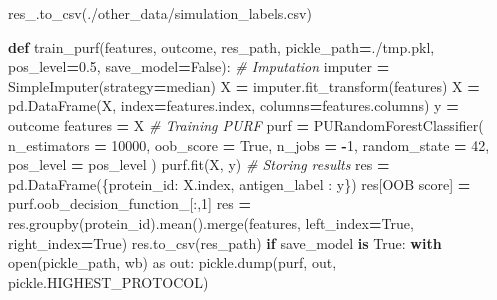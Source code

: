 \documentclass[
  11pt,
  oneside]{book}
\newenvironment{Shaded}{\begin{snugshade}}{\end{snugshade}}
\newcommand{\BuiltInTok}[1]{#1}
\newcommand{\CommentTok}[1]{\textcolor[rgb]{0.56,0.35,0.01}{\textit{#1}}}
\newcommand{\ControlFlowTok}[1]{\textcolor[rgb]{0.13,0.29,0.53}{\textbf{#1}}}
\newcommand{\DecValTok}[1]{\textcolor[rgb]{0.00,0.00,0.81}{#1}}
\newcommand{\FloatTok}[1]{\textcolor[rgb]{0.00,0.00,0.81}{#1}}
\newcommand{\ImportTok}[1]{#1}
\newcommand{\KeywordTok}[1]{\textcolor[rgb]{0.13,0.29,0.53}{\textbf{#1}}}
\newcommand{\NormalTok}[1]{#1}
\newcommand{\OperatorTok}[1]{\textcolor[rgb]{0.81,0.36,0.00}{\textbf{#1}}}
\newcommand{\StringTok}[1]{\textcolor[rgb]{0.31,0.60,0.02}{#1}}
\newcommand{\VariableTok}[1]{\textcolor[rgb]{0.00,0.00,0.00}{#1}}
\begin{document}
\begin{Shaded}
\begin{Highlighting}[]
\NormalTok{res\_.to\_csv(}\StringTok{\textquotesingle{}./other\_data/simulation\_labels.csv\textquotesingle{}}\NormalTok{)}
\end{Highlighting}
\end{Shaded}

\begin{Shaded}
\begin{Highlighting}[]
\KeywordTok{def}\NormalTok{ train\_purf(features, outcome, res\_path, pickle\_path}\OperatorTok{=}\StringTok{\textquotesingle{}./tmp.pkl\textquotesingle{}}\NormalTok{, pos\_level}\OperatorTok{=}\FloatTok{0.5}\NormalTok{, save\_model}\OperatorTok{=}\VariableTok{False}\NormalTok{):}
    \CommentTok{\# Imputation}
\NormalTok{    imputer }\OperatorTok{=}\NormalTok{ SimpleImputer(strategy}\OperatorTok{=}\StringTok{\textquotesingle{}median\textquotesingle{}}\NormalTok{)}
\NormalTok{    X }\OperatorTok{=}\NormalTok{ imputer.fit\_transform(features)}
\NormalTok{    X }\OperatorTok{=}\NormalTok{ pd.DataFrame(X, index}\OperatorTok{=}\NormalTok{features.index, columns}\OperatorTok{=}\NormalTok{features.columns)}
\NormalTok{    y }\OperatorTok{=}\NormalTok{ outcome}
\NormalTok{    features }\OperatorTok{=}\NormalTok{ X}
    \CommentTok{\# Training PURF}
\NormalTok{    purf }\OperatorTok{=}\NormalTok{ PURandomForestClassifier(}
\NormalTok{        n\_estimators }\OperatorTok{=} \DecValTok{10000}\NormalTok{,}
\NormalTok{        oob\_score }\OperatorTok{=} \VariableTok{True}\NormalTok{,}
\NormalTok{        n\_jobs }\OperatorTok{=} \OperatorTok{{-}}\DecValTok{1}\NormalTok{,}
\NormalTok{        random\_state }\OperatorTok{=} \DecValTok{42}\NormalTok{,}
\NormalTok{        pos\_level }\OperatorTok{=}\NormalTok{ pos\_level}
\NormalTok{    )}
\NormalTok{    purf.fit(X, y)}
    \CommentTok{\# Storing results}
\NormalTok{    res }\OperatorTok{=}\NormalTok{ pd.DataFrame(\{}\StringTok{\textquotesingle{}protein\_id\textquotesingle{}}\NormalTok{: X.index, }\StringTok{\textquotesingle{}antigen\_label\textquotesingle{}}\NormalTok{ : y\})}
\NormalTok{    res[}\StringTok{\textquotesingle{}OOB score\textquotesingle{}}\NormalTok{] }\OperatorTok{=}\NormalTok{ purf.oob\_decision\_function\_[:,}\DecValTok{1}\NormalTok{]}
\NormalTok{    res }\OperatorTok{=}\NormalTok{ res.groupby(}\StringTok{\textquotesingle{}protein\_id\textquotesingle{}}\NormalTok{).mean().merge(features, left\_index}\OperatorTok{=}\VariableTok{True}\NormalTok{, right\_index}\OperatorTok{=}\VariableTok{True}\NormalTok{)}
\NormalTok{    res.to\_csv(res\_path)}
    \ControlFlowTok{if}\NormalTok{ save\_model }\KeywordTok{is} \VariableTok{True}\NormalTok{:}
        \ControlFlowTok{with} \BuiltInTok{open}\NormalTok{(pickle\_path, }\StringTok{\textquotesingle{}wb\textquotesingle{}}\NormalTok{) }\ImportTok{as}\NormalTok{ out:}
\NormalTok{            pickle.dump(purf, out, pickle.HIGHEST\_PROTOCOL)}


\end{Highlighting}
\end{Shaded}
\end{document}
